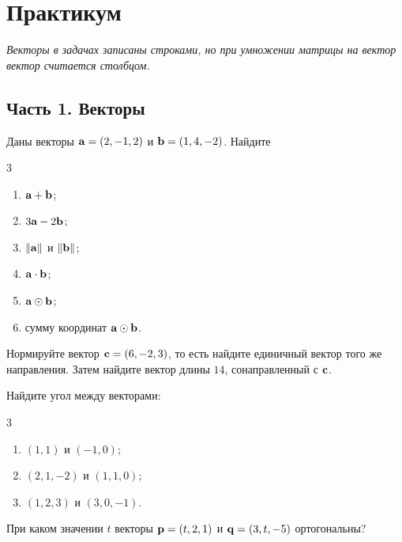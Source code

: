 \newpage
\section*{Практикум}
\textit{Векторы в задачах записаны строками, но при умножении матрицы на вектор вектор считается столбцом.}

\subsection*{Часть 1. Векторы}

\begin{exercise}
Даны векторы $\mathbf{a}=(2,-1,2)$ и $\mathbf{b}=(1,4,-2)$. Найдите
\begin{multicols}{3}
\begin{enumerate}[label=\asbuk*)]
  \item $\mathbf{a}+\mathbf{b}$;
  \item $3\mathbf{a}-2\mathbf{b}$;
  \item $\lVert \mathbf{a}\rVert$ и $\lVert \mathbf{b}\rVert$;
  \item $\mathbf{a}\cdot\mathbf{b}$;
  \item $\mathbf{a}\odot\mathbf{b}$;
  \item сумму координат $\mathbf{a}\odot\mathbf{b}$.
\end{enumerate}
\end{multicols}
\end{exercise}

\begin{exercise}
Нормируйте вектор $\mathbf{c}=(6,-2,3)$, то есть найдите единичный вектор того же направления. Затем найдите вектор длины $14$, сонаправленный с $\mathbf{c}$.
\end{exercise}

\begin{exercise}
Найдите угол между векторами:
\begin{multicols}{3}
\begin{enumerate}[label=\asbuk*)]
  \item $(1,1)$ и $(-1,0)$;
  \item $(2,1,-2)$ и $(1,1,0)$;
  \item $(1,2,3)$ и $(3,0,-1)$.
\end{enumerate}
\end{multicols}
\end{exercise}

\begin{exercise}
При каком значении $t$ векторы $\mathbf{p}=(t,2,1)$ и $\mathbf{q}=(3,t,-5)$ ортогональны?
\end{exercise}

